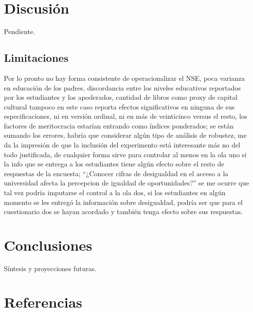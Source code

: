 \documentclass[
  spanish,
  a4paper,
  oneside]{scrbook}
\begin{document}

\chapter{Discusión}\label{discusiuxf3n}

Pendiente.

\section{Limitaciones}\label{limitaciones}

Por lo pronto no hay forma consistente de operacionalizar el NSE, poca
varianza en educación de los padres, discordancia entre los niveles
educativos reportados por los estudiantes y los apoderados, cantidad de
libros como proxy de capital cultural tampoco en este caso reporta
efectos significativos en ninguna de sus especificaciones, ni en versión
ordinal, ni en más de veinticinco versus el resto, los factores de
meritocracia estarían entrando como índices ponderados; se están sumando
los errores, habría que considerar algún tipo de análisis de robustez,
me da la impresión de que la inclusión del experimento está interesante
más no del todo justificada, de cualquier forma sirve para controlar al
menos en la ola uno si la info que se entrega a los estudiantes tiene
algún efecto sobre el resto de respuestas de la encuesta; ``¿Conocer
cifras de desigualdad en el acceso a la universidad afecta la percepcion
de igualdad de oportunidades?'' se me ocurre que tal vez podría
imputarse el control a la ola dos, si los estudiantes en algún momento
se les entregó la información sobre desigualdad, podría ser que para el
cuestionario dos se hayan acordado y también tenga efecto sobre sus
respuestas.


\chapter{Conclusiones}\label{conclusiones}

Síntesis y proyecciones futuras.


\chapter{Referencias}\label{referencias}
\end{document}
